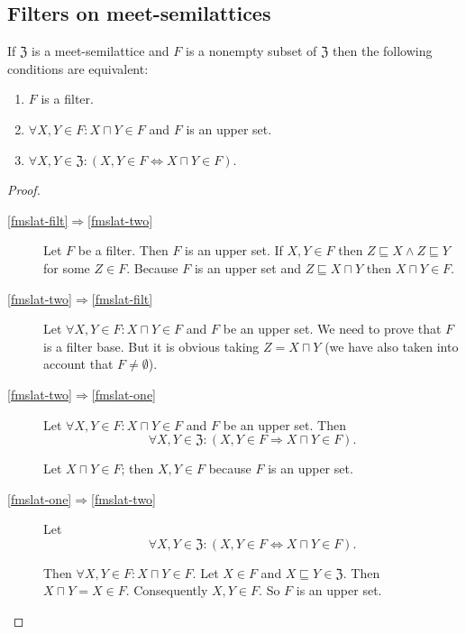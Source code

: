 \subsection{Filters on meet-semilattices}
\begin{thm}
\label{filt-eq-char}If $\mathfrak{Z}$
is a meet-semilattice and $F$ is a nonempty subset of $\mathfrak{Z}$
then the following conditions are equivalent:
\begin{enumerate}
\item \label{fmslat-filt}$F$ is a filter.
\item \label{fmslat-two}$\forall X,Y\in F:X\sqcap Y\in F$ and $F$ is
an upper set.
\item \label{fmslat-one}$\forall X,Y\in\mathfrak{Z}:(X,Y\in F\Leftrightarrow X\sqcap Y\in F)$.
\end{enumerate}
\end{thm}
\begin{proof}
~
\begin{description}
\item [{\ref{fmslat-filt}$\Rightarrow$\ref{fmslat-two}}] Let $F$ be
a filter. Then $F$ is an upper set. If $X,Y\in F$ then $Z\sqsubseteq X\land Z\sqsubseteq Y$
for some $Z\in F$. Because $F$ is an upper set and $Z\sqsubseteq X\sqcap Y$
then $X\sqcap Y\in F$.
\item [{\ref{fmslat-two}$\Rightarrow$\ref{fmslat-filt}}] Let $\forall X,Y\in F:X\sqcap Y\in F$
and $F$ be an upper set. We need to prove that $F$ is a filter base.
But it is obvious taking $Z=X\sqcap Y$ (we have also taken into account
that $F\ne\emptyset$).
\item [{\ref{fmslat-two}$\Rightarrow$\ref{fmslat-one}}] Let $\forall X,Y\in F:X\sqcap Y\in F$
and $F$ be an upper set. Then
\[
\forall X,Y\in\mathfrak{Z}:(X,Y\in F\Rightarrow X\sqcap Y\in F).
\]



Let $X\sqcap Y\in F$; then $X,Y\in F$ because $F$ is an upper set.

\item [{\ref{fmslat-one}$\Rightarrow$\ref{fmslat-two}}] Let
\[
\forall X,Y\in\mathfrak{Z}:(X,Y\in F\Leftrightarrow X\sqcap Y\in F).
\]



Then $\forall X,Y\in F:X\sqcap Y\in F$. Let $X\in F$ and $X\sqsubseteq Y\in\mathfrak{Z}$.
Then $X\sqcap Y=X\in F$. Consequently $X,Y\in F$. So $F$ is an
upper set.

\end{description}
\end{proof}

